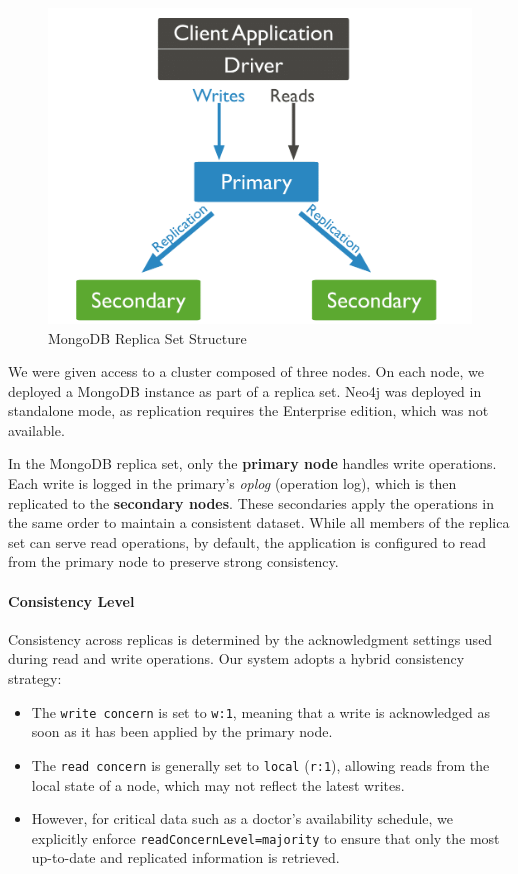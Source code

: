 \begin{figure}[!h]
    \centering
    \includegraphics[scale=0.2]{./resources/mongo_replica.png}
    \caption{MongoDB Replica Set Structure}
    \label{fig:mongo-replica}
\end{figure}

We were given access to a cluster composed of three nodes. On each node, we deployed a MongoDB instance as part of a replica set. Neo4j was deployed in standalone mode, as replication requires the Enterprise edition, which was not available.

In the MongoDB replica set, only the \textbf{primary node} handles write operations. Each write is logged in the primary’s \emph{oplog} (operation log), which is then replicated to the \textbf{secondary nodes}. These secondaries apply the operations in the same order to maintain a consistent dataset. While all members of the replica set can serve read operations, by default, the application is configured to read from the primary node to preserve strong consistency.

\paragraph{Consistency Level}

Consistency across replicas is determined by the acknowledgment settings used during read and write operations. Our system adopts a hybrid consistency strategy:

\begin{itemize}
  \item The \texttt{write concern} is set to \texttt{w:1}, meaning that a write is acknowledged as soon as it has been applied by the primary node.
  \item The \texttt{read concern} is generally set to \texttt{local} (\texttt{r:1}), allowing reads from the local state of a node, which may not reflect the latest writes.
  \item However, for critical data such as a doctor's availability schedule, we explicitly enforce \texttt{readConcernLevel=majority} to ensure that only the most up-to-date and replicated information is retrieved.
\end{itemize}


